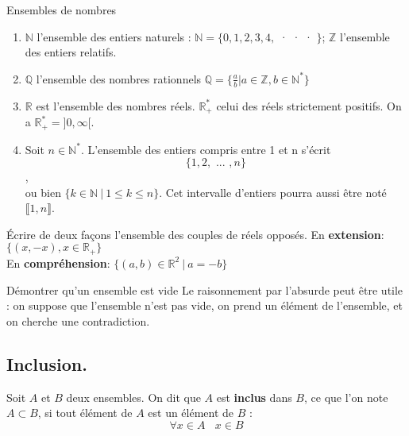 \documentclass[11pt]{article}
\newcommand*{\R}{\mathbb{R}}
\newcommand*{\Q}{\mathbb{Q}}
\newcommand*{\Z}{\mathbb{Z}}
\newcommand*{\N}{\mathbb{N}}
\newcommand*{\lb}{\llbracket}
\newcommand*{\rb}{\rrbracket}
\newcommand{\0}{\varnothing}
\begin{document}
\begin{ex}{Ensembles de nombres}{}
    \begin{enumerate}
        \item $\N$ l'ensemble des entiers naturels : $\N = \{ 0, 1, 2, 3, 4,$ · · · $\}$; $\Z$ l'ensemble des entiers relatifs.
        \item $\Q$ l'ensemble des nombres rationnels $\Q = \{ \frac{a}{b} | a \in \Z, b \in \N^{*} \}$
        \item $\R$ est l'ensemble des nombres réels. $\R^{*}_{+}$ celui des réels strictement positifs. On a $\R^{*}_{+} = \rbrack 0, \infty \lbrack$.
        \item Soit $n \in \N^{*}$. L'ensemble des entiers compris entre 1 et n s'écrit
        \begin{equation*}
            \{ 1, 2, \text{ ... }, n \}
        \end{equation*}, \\
        ou bien $\{k \in \N ~|~ 1 \leq k \leq n \}$. Cet intervalle d'entiers pourra aussi être noté $\lb 1, n \rb$.
    \end{enumerate}
\end{ex}

\begin{ex}{}{}
    Écrire de deux façons l'ensemble des couples de réels opposés.
    \tcblower
    En \textbf{extension}: $\{(x, -x), x \in \R_{+} \}$\\
    En \textbf{compréhension}: $\{(a, b) \in \R^{2} ~|~ a = -b \}$
\end{ex}

\begin{meth*}{Démontrer qu'un ensemble est vide}{}
    Le raisonnement par l'absurde peut être utile : on suppose que l'ensemble n'est pas vide, on prend un élément de l'ensemble, et on cherche une contradiction.
\end{meth*}

\subsection{Inclusion.}

\begin{defi}{}{}
    Soit $A$ et $B$ deux ensembles. On dit que $A$ est \textbf{inclus} dans $B$, ce que l'on note $A \subset B$, si tout élément de $A$ est un élément de $B$ : 
    \begin{equation*}
        \forall x \in A ~~~~x \in B
    \end{equation*}
\end{defi}
\end{document}
